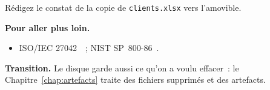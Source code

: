 \begin{boxexo}[title={\ding{45}\quad Exercice~10.10. Constat \niveauexpert}]
Rédigez le constat de la copie de \texttt{clients.xlsx} vers l'amovible.
\end{boxexo}

\bigskip

\begin{boxinfo}
\textbf{Pour aller plus loin.}
\begin{itemize}
    \item ISO/IEC 27042~\cite{iso27042}~; NIST SP~800-86~\cite{nist80086}.
\end{itemize}
\end{boxinfo}

\begin{boxinfo}
\textbf{Transition.} Le disque garde aussi ce qu'on a voulu effacer~: le
Chapitre~\ref{chap:artefacts} traite des fichiers supprimés et des artefacts.
\end{boxinfo}
